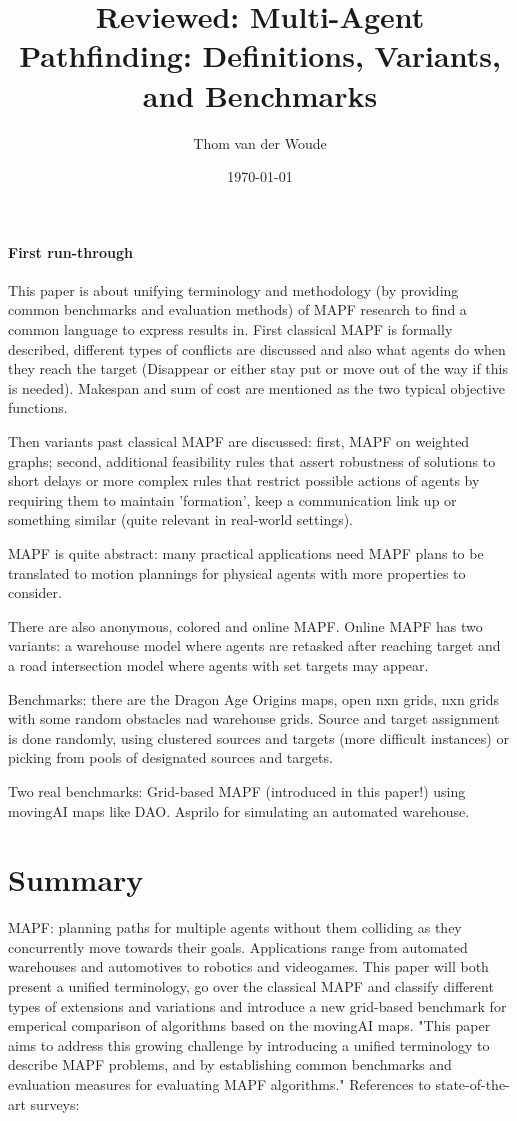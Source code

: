 \documentclass[a4paper,10pt,english]{article}
\title{Reviewed: Multi-Agent Pathfinding: Definitions, Variants, and Benchmarks}
\author{Thom van der Woude}
\date{\today}
\begin{document}
	\maketitle
	\paragraph{First run-through}
	This paper is about unifying terminology and methodology (by providing common benchmarks and evaluation methods) of MAPF research to find a common language to express results in. First classical MAPF is formally described, different types of conflicts are discussed and also what agents do when they reach the target (Disappear or either stay put or move out of the way if this is needed). Makespan and sum of cost are mentioned as the two typical objective functions.
	
	Then variants past classical MAPF are discussed: first, MAPF on weighted graphs; second, additional feasibility rules that assert robustness of solutions to short delays or more complex rules that restrict possible actions of agents by requiring them to maintain 'formation', keep a communication link up or something similar (quite relevant in real-world settings).
	
	MAPF is quite abstract: many practical applications need MAPF plans to be translated to motion plannings for physical agents with more properties to consider.
	
	There are also anonymous, colored and online MAPF. Online MAPF has two variants: a warehouse model where agents are retasked after reaching target and a road intersection model where agents with set targets may appear.
	
	Benchmarks: there are the Dragon Age Origins maps, open nxn grids, nxn grids with some random obstacles nad warehouse grids. Source and target assignment is done randomly, using clustered sources and targets (more difficult instances) or picking from pools of designated sources and targets.
	
	Two real benchmarks: Grid-based MAPF (introduced in this paper!) using movingAI maps like DAO.
	Asprilo for simulating an automated warehouse.
	\section{Summary}
	MAPF: planning paths for multiple agents without them colliding as they concurrently move towards their goals. Applications range from automated warehouses and automotives to robotics and videogames. This paper will both present a unified terminology, go over the classical MAPF and classify different types of extensions and variations and introduce a new grid-based benchmark for emperical comparison of algorithms based on the movingAI maps. "This paper aims to address this growing challenge by introducing a unified terminology to describe MAPF problems, and by establishing common benchmarks and evaluation measures for evaluating MAPF algorithms." References to state-of-the-art surveys: \cite{Felner2017,ma2016}
\end{document}
